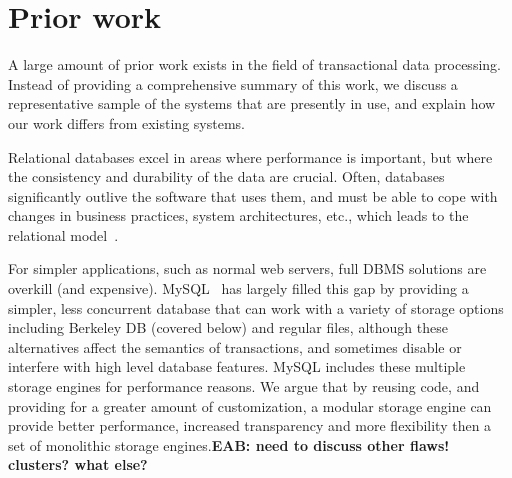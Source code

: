 \documentclass[letterpaper,twocolumn,english]{article}
\newcommand{\yad}{Lemon\xspace}
\newcommand{\eab}[1]{{\bf EAB: #1}}
\begin{document}
\section{Prior work}

A large amount of prior work exists in the field of transactional data
processing.  Instead of providing a comprehensive summary of this
work, we discuss a representative sample of the systems that are
presently in use, and explain how our work differs from existing
systems.




Relational databases excel in areas
where performance is important, but where the consistency and
durability of the data are crucial.  Often, databases significantly
outlive the software that uses them, and must be able to cope with
changes in business practices, system architectures,
etc., which leads to the relational model~\cite{relational}.

For simpler applications, such as normal web servers, full DBMS
solutions are overkill (and expensive).  MySQL~\cite{mysql} has
largely filled this gap by providing a simpler, less concurrent
database that can work with a variety of storage options including
Berkeley DB (covered below) and regular files, although these
alternatives affect the semantics of transactions, and sometimes 
disable or interfere with high level database features.  MySQL 
includes these multiple storage engines for performance reasons.  
We argue that by reusing code, and providing for a greater amount 
of customization, a modular storage engine can provide better 
performance, increased transparency and more flexibility then a 
set of monolithic storage engines.\eab{need to discuss other flaws! clusters? what else?}

\end{document}

